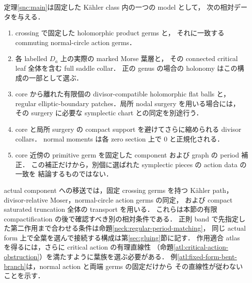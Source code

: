 定理\ref{snc:main}は固定した Kähler class 内の一つの model として，
次の相対データを与える．
\begin{enumerate}
\item crossing で固定した holomorphic product germs と，
それに一致する commuting normal-circle action germs．
\item 各 labelled $D_a$ 上の実際の marked Morse 葉層と，
その connected critical leaf 全体を含む full saddle collar．
正の genus の場合の holonomy はこの構成の一部として選ぶ．
\item core から離れた有限個の divisor-compatible holomorphic flat balls と，
regular elliptic-boundary patches．局所 nodal surgery を用いる場合には，
その surgery に必要な symplectic chart との同定を別途行う．
\item core と局所 surgery の compact support を避けてさらに縮められる divisor collars．
normal moments は各 zero section 上で $0$ と正規化される．
\item core 近傍の primitive germ を固定した component および graph の period 補正．
この補正だけから，別個に選ばれた symplectic pieces の action data の一致を
結論するものではない．
\end{enumerate}
actual component への移送では，固定 crossing germs を持つ Kähler path，
divisor-relative Moser，normal-circle action germs の同定，
および compact saturated truncation 全体の transport を用いる．
これらは本節の有限 compactification の後で確認すべき別の相対条件である．
正則 band で先指定した第二作用まで合わせる条件は命題\ref{neck:regular-period-matching}，
同じ actual form 上で全葉を選んで接続する構成は第\ref{sec:gluing}節に記す．
作用適合 atlas を得るには，さらに critical action の有理直線性
（命題\ref{atl:critical-action-obstruction}）を満たすように葉族を選ぶ必要がある．
例\ref{atl:fixed-form-bent-branch}は，normal action と両端 germs の固定だけから
その直線性が従わないことを示す．

